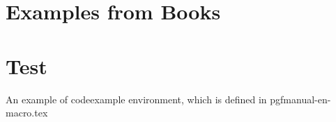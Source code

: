 \documentclass[10pt,a4paper,extrafontsizes]{memoir}
\newcommand\svnidlong[4]{}
\begin{document}

\tightlists
\midsloppy
\raggedbottom
{}


% 

\frontmatter




\cleardoublepage
{}

\mainmatter






\svnidlong
{$Ignore: $}
{$LastChangedDate: 2010-07-15 22:37:02 +0200 (Thu, 15 Jul 2010) $}
{$LastChangedRevision: 256 $}
{$LastChangedBy: daleif $}


\chapter{Examples from Books} %
\label{chap:examples_from_books}



\chapter{Test} %
\label{chap:test}


An example of codeexample environment, which is defined in pgfmanual-en-macro.tex
\begin{codeexample}
\usepackage{pgfplots}
\pgfplotsset{compat=1.3}
\end{codeexample}



\begin{codeexample}[]
%
\end{codeexample}
\end{document}
